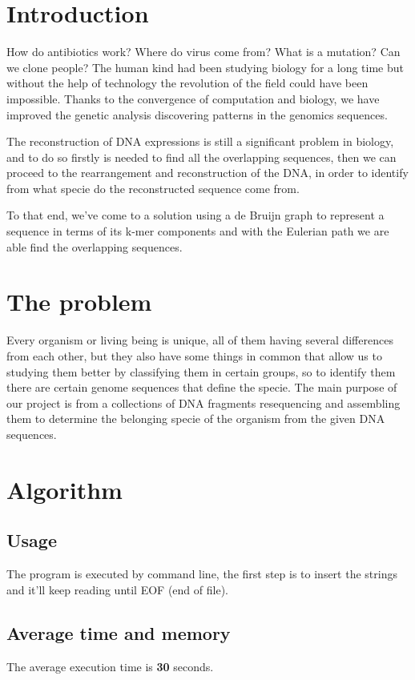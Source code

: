 \section{Introduction}

How do antibiotics work? Where do virus come from? What is a mutation? Can we clone people? The human kind had been studying biology for a long time but without the help of technology the revolution of the field could have been impossible. Thanks to the convergence of computation and biology, we have improved the genetic analysis discovering patterns in the genomics sequences.

The reconstruction of DNA expressions is still a significant problem in biology, and to do so firstly is needed to find all the overlapping sequences, then we can proceed to the rearrangement and reconstruction of the DNA, in order to identify from what specie do the reconstructed sequence come from.

To that end, we've come to a solution using a de Bruijn graph to represent a sequence in terms of its k-mer components and with the Eulerian path we are able find the overlapping sequences.

\section{The problem}
Every organism or living being is unique, all of them having several differences from each other, but they also have some things in common that allow us to studying them better by classifying them in certain groups, so to identify them there are certain genome sequences that define the specie. The main purpose of our project is from a collections of DNA fragments resequencing and assembling them to determine the belonging specie of the organism from the given DNA sequences.

\section{Algorithm}
\subsection{Usage}
The program is executed by command line, the first step is to insert the strings and it'll keep reading until EOF (end of file).
\subsection{Average time and memory}
The average execution time is \textbf{30} seconds.

